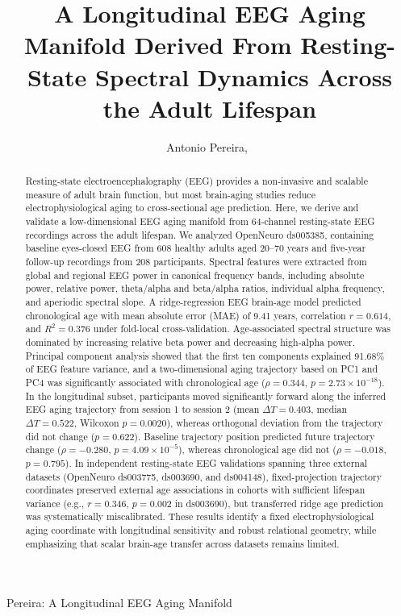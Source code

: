 \documentclass[journal]{IEEEtran}
\begin{document}
\title{A Longitudinal EEG Aging Manifold Derived From Resting-State Spectral Dynamics Across the Adult Lifespan}

\author{Antonio Pereira,~}

%
{Pereira: A Longitudinal EEG Aging Manifold}

\maketitle

\begin{abstract}
Resting-state electroencephalography (EEG) provides a non-invasive and scalable measure of adult brain function, but most brain-aging studies reduce electrophysiological aging to cross-sectional age prediction. Here, we derive and validate a low-dimensional EEG aging manifold from 64-channel resting-state EEG recordings across the adult lifespan. We analyzed OpenNeuro ds005385, containing baseline eyes-closed EEG from 608 healthy adults aged 20--70 years and five-year follow-up recordings from 208 participants. Spectral features were extracted from global and regional EEG power in canonical frequency bands, including absolute power, relative power, theta/alpha and beta/alpha ratios, individual alpha frequency, and aperiodic spectral slope. A ridge-regression EEG brain-age model predicted chronological age with mean absolute error (MAE) of 9.41 years, correlation $r=0.614$, and $R^2=0.376$ under fold-local cross-validation. Age-associated spectral structure was dominated by increasing relative beta power and decreasing high-alpha power. Principal component analysis showed that the first ten components explained 91.68\% of EEG feature variance, and a two-dimensional aging trajectory based on PC1 and PC4 was significantly associated with chronological age ($\rho=0.344$, $p=2.73\times10^{-18}$). In the longitudinal subset, participants moved significantly forward along the inferred EEG aging trajectory from session 1 to session 2 (mean $\Delta T=0.403$, median $\Delta T=0.522$, Wilcoxon $p=0.0020$), whereas orthogonal deviation from the trajectory did not change ($p=0.622$). Baseline trajectory position predicted future trajectory change ($\rho=-0.280$, $p=4.09\times10^{-5}$), whereas chronological age did not ($\rho=-0.018$, $p=0.795$). In independent resting-state EEG validations spanning three external datasets (OpenNeuro ds003775, ds003690, and ds004148), fixed-projection trajectory coordinates preserved external age associations in cohorts with sufficient lifespan variance (e.g., $r=0.346$, $p=0.002$ in ds003690), but transferred ridge age prediction was systematically miscalibrated. These results identify a fixed electrophysiological aging coordinate with longitudinal sensitivity and robust relational geometry, while emphasizing that scalar brain-age transfer across datasets remains limited.
\end{abstract}
\end{document}
